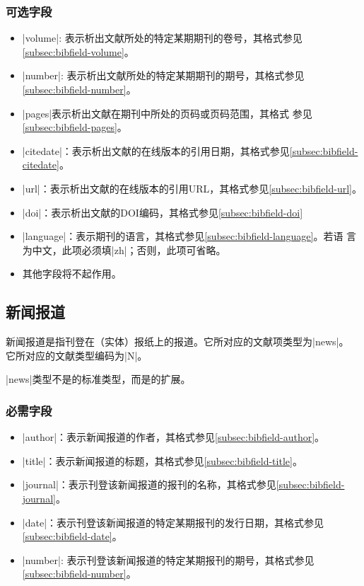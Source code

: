 \subsubsection{可选字段}

\begin{itemize}
\item |volume|: 表示析出文献所处的特定某期期刊的卷号，其格式参见\ref{subsec:bibfield-volume}。
\item |number|: 表示析出文献所处的特定某期期刊的期号，其格式参见\ref{subsec:bibfield-number}。
\item |pages|表示析出文献在期刊中所处的页码或页码范围，其格式
  参见\ref{subsec:bibfield-pages}。
\item |citedate|：表示析出文献的在线版本的引用日期，其格式参见\ref{subsec:bibfield-citedate}。
\item |url|：表示析出文献的在线版本的引用URL，其格式参见\ref{subsec:bibfield-url}。
\item |doi|：表示析出文献的DOI编码，其格式参见\ref{subsec:bibfield-doi}
\item |language|：表示期刊的语言，其格式参见\ref{subsec:bibfield-language}。若语
  言为中文，此项必须填|zh|；否则，此项可省略。
\item 其他字段将不起作用。
\end{itemize}


\subsection{新闻报道}\label{subsec:bibtype-news}

新闻报道是指刊登在（实体）报纸上的报道。它所对应的{\BibTeX}文献项类型为|news|。
它所对应的文献类型编码为|N|\cite{gbt3469-1983}。

|news|类型不是{\BibTeX}的标准类型，而是{\njuthesis}的扩展。

\subsubsection{必需字段}

\begin{itemize}
\item |author|：表示新闻报道的作者，其格式参见\ref{subsec:bibfield-author}。
\item |title|：表示新闻报道的标题，其格式参见\ref{subsec:bibfield-title}。
\item |journal|：表示刊登该新闻报道的报刊的名称，其格式参见\ref{subsec:bibfield-journal}。
\item |date|：表示刊登该新闻报道的特定某期报刊的发行日期，其格式参见\ref{subsec:bibfield-date}。
\item |number|: 表示刊登该新闻报道的特定某期报刊的期号，其格式参见\ref{subsec:bibfield-number}。
\end{itemize}

